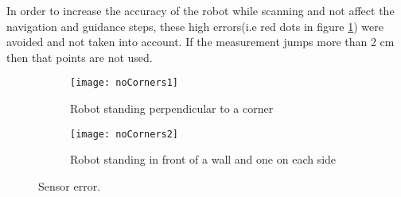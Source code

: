 In order to increase the accuracy of the robot while scanning and not affect the navigation and guidance steps, these high errors(i.e red dots in figure \ref{fig:sensorerrors}) were avoided and not taken into account. If the measurement jumps more than 2 cm then that points are not used.

\begin{figure}[h]
\centering
	\begin{subfigure}{0.5\textwidth}
		\texttt{[image: noCorners1]}
		\caption{Robot standing perpendicular to a corner}
	\end{subfigure}
	\begin{subfigure}{0.4\textwidth}
		\texttt{[image: noCorners2]}
		\caption{Robot standing in front of a wall and one on each side}
	\end{subfigure}
	\caption{Sensor error.}
	\label{fig:sensorerrors}
\end{figure}
\FloatBarrier
